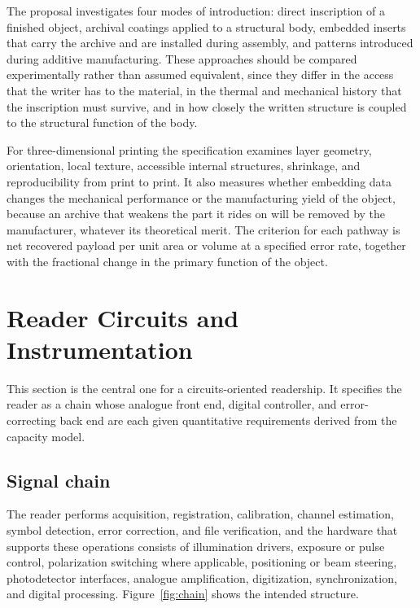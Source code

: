 The proposal investigates four modes of introduction: direct inscription of a finished object, archival coatings applied to a structural body, embedded inserts that carry the archive and are installed during assembly, and patterns introduced during additive manufacturing. These approaches should be compared experimentally rather than assumed equivalent, since they differ in the access that the writer has to the material, in the thermal and mechanical history that the inscription must survive, and in how closely the written structure is coupled to the structural function of the body.

For three-dimensional printing the specification examines layer geometry, orientation, local texture, accessible internal structures, shrinkage, and reproducibility from print to print. It also measures whether embedding data changes the mechanical performance or the manufacturing yield of the object, because an archive that weakens the part it rides on will be removed by the manufacturer, whatever its theoretical merit. The criterion for each pathway is net recovered payload per unit area or volume at a specified error rate, together with the fractional change in the primary function of the object.

\section{Reader Circuits and Instrumentation}\label{sec:reader}

This section is the central one for a circuits-oriented readership. It specifies the reader as a chain whose analogue front end, digital controller, and error-correcting back end are each given quantitative requirements derived from the capacity model.

\subsection{Signal chain}\label{sec:chain}

The reader performs acquisition, registration, calibration, channel estimation, symbol detection, error correction, and file verification, and the hardware that supports these operations consists of illumination drivers, exposure or pulse control, polarization switching where applicable, positioning or beam steering, photodetector interfaces, analogue amplification, digitization, synchronization, and digital processing. Figure~\ref{fig:chain} shows the intended structure.

